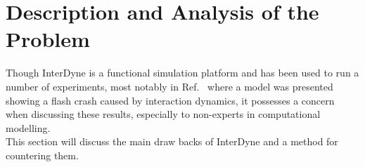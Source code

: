\documentclass{article}
\begin{document}






\section {Description and Analysis of the Problem} 
Though InterDyne is a functional simulation platform and has been used to run a number of experiments, most notably in Ref.~\cite{DynamicCoupling_Chris} where a model was presented showing a flash crash caused by interaction dynamics, it possesses a concern when discussing these results, especially to non-experts in computational modelling.\\
This section will discuss the main draw backs of InterDyne and a method for countering them.  
\end{document}
